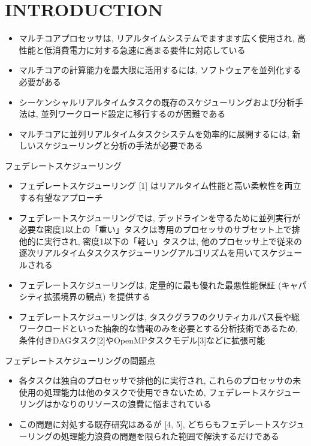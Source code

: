 
\section{INTRODUCTION}
\label{sec: introduction}

\begin{frame}{}
    \begin{itemize}
        \item マルチコアプロセッサは, リアルタイムシステムでますます広く使用され, 高性能と低消費電力に対する急速に高まる要件に対応している
        \item マルチコアの計算能力を最大限に活用するには, ソフトウェアを並列化する必要がある
        \item シーケンシャルリアルタイムタスクの既存のスケジューリングおよび分析手法は, 並列ワークロード設定に移行するのが困難である
        \item マルチコアに並列リアルタイムタスクシステムを効率的に展開するには, 新しいスケジューリングと分析の手法が必要である
    \end{itemize}
\end{frame}

\begin{frame}{フェデレートスケジューリング}
    \begin{itemize}
        \item フェデレートスケジューリング [1] はリアルタイム性能と高い柔軟性を両立する有望なアプローチ
        \item フェデレートスケジューリングでは, デッドラインを守るために並列実行が必要な密度1以上の「重い」タスクは専用のプロセッサのサブセット上で排他的に実行され, 密度1以下の「軽い」タスクは, 他のプロセッサ上で従来の逐次リアルタイムタスクスケジューリングアルゴリズムを用いてスケジュールされる
        \item フェデレートスケジューリングは, 定量的に最も優れた最悪性能保証 (キャパシティ拡張境界の観点) を提供する
        \item フェデレートスケジューリングは, タスクグラフのクリティカルパス長や総ワークロードといった抽象的な情報のみを必要とする分析技術であるため, 条件付きDAGタスク[2]やOpenMPタスクモデル[3]などに拡張可能
    \end{itemize}
\end{frame}

\begin{frame}{フェデレートスケジューリングの問題点}
    \begin{itemize}
        \item 各タスクは独自のプロセッサで排他的に実行され, これらのプロセッサの未使用の処理能力は他のタスクで使用できないため, フェデレートスケジューリングはかなりのリソースの浪費に悩まされている
        \item この問題に対処する既存研究はあるが [4, 5], どちらもフェデレートスケジューリングの処理能力浪費の問題を限られた範囲で解決するだけである
    \end{itemize}
\end{frame}

